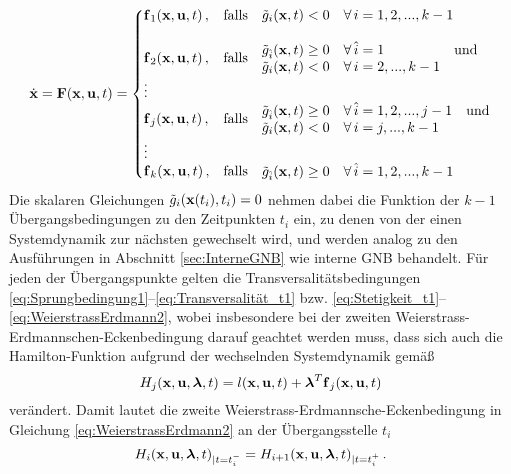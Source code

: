 \begin{equation}
\dx = \ve{F}(\ve{x},\ve{u},t) = \left\{\begin{matrix*}[l]
\ve{f}_1(\ve{x},\ve{u},t)\,, & \mathrm{falls} & \begin{matrix}\tilde{{g}}_i(\ve{x},t) < 0 &\forall\, i = 1,2,...,k-1\end{matrix}\\
&\\
\ve{f}_2(\ve{x},\ve{u},t)\,, & \mathrm{falls} & 
\begin{matrix*}[l]
\tilde{{g}}_{\hat{i}}(\ve{x},t) \geq 0 &\forall\, \hat{i} = 1 &\textrm{und} \\ \tilde{{g}}_i(\ve{x},t) < 0 &\forall\, i = 2,...,k-1&
\end{matrix*}
\\
\vdots & & \\
\ve{f}_j(\ve{x},\ve{u},t)\,, & \mathrm{falls} & \begin{matrix*}[l]
\tilde{{g}}_{\hat{i}}(\ve{x},t) \geq 0 &\forall \, \hat{i} = 1,2,...,j-1 &\textrm{und} \\ \tilde{{g}}_i(\ve{x},t) < 0 &\forall\, i = j,...,k-1&
\end{matrix*}\\
\vdots & & \\
\ve{f}_k(\ve{x},\ve{u},t)\,, & \mathrm{falls} & \begin{matrix}\tilde{{g}}_{\hat{i}}(\ve{x},t) \geq 0 &\forall\, \hat{i} = 1,2,...,k-1
\end{matrix}
\end{matrix*}\right. \label{eq:Diskontinuität}
\end{equation}
Die skalaren Gleichungen $\tilde{{g}}_i(\boldsymbol{\mathrm{x}}(t_i),t_i) = 0$ nehmen dabei die Funktion der $k-1$ Übergangsbedingungen zu den Zeitpunkten $t_i$ ein, zu denen von der einen Systemdynamik zur nächsten gewechselt wird, und werden analog zu den Ausführungen in Abschnitt \ref{sec:InterneGNB} wie interne \gls{GNB} behandelt. Für jeden der Übergangspunkte gelten die Transversalitätsbedingungen \eqref{eq:Sprungbedingung1}--\eqref{eq:Transversalität_t1} bzw. \eqref{eq:Stetigkeit_t1}--\eqref{eq:WeierstrassErdmann2}, wobei insbesondere bei der zweiten Weierstrass-Erdmannschen-Eckenbedingung darauf geachtet werden muss, dass sich auch die Hamilton-Funktion aufgrund der wechselnden Systemdynamik gemäß
\begin{equation}
	H_j(\boldsymbol{\mathrm{x}},\boldsymbol{\mathrm{u}},\boldsymbol{\mathrm{\lambda}},t) = l(\boldsymbol{\mathrm{x}},\boldsymbol{\mathrm{u}},t) + \boldsymbol{\mathrm{\lambda}}^T\boldsymbol{\mathrm{f}}_j(\boldsymbol{\mathrm{x}},\boldsymbol{\mathrm{u}},t) \label{eq:Hamilton_j}
\end{equation} 
verändert. Damit lautet die zweite Weierstrass-Erdmannsche-Eckenbedingung in Gleichung \eqref{eq:WeierstrassErdmann2} an der Übergangsstelle $t_i$
\begin{equation}
H_i(\boldsymbol{\mathrm{x}},\boldsymbol{\mathrm{u}},\boldsymbol{\mathrm{\lambda}},t)_{|t=t_i^-} = H_{i+1}(\boldsymbol{\mathrm{x}},\boldsymbol{\mathrm{u}},\boldsymbol{\mathrm{\lambda}},t)_{|t=t_i^+}\,. \label{eq:WeierstrassErdmann2_j}
\end{equation}

